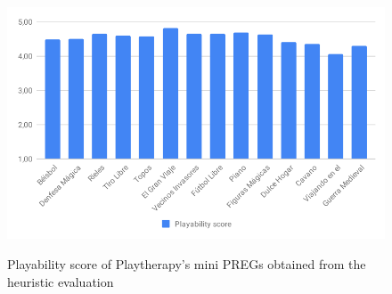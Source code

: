 \begin{figure}[bth]
\myfloatalign
{\includegraphics[width=\linewidth]{gfx/playtherapy/playability}} \quad
\caption{Playability score of Playtherapy's mini \acp{PREG} obtained from the heuristic evaluation}
\label{fig:playability_score}
\end{figure}



